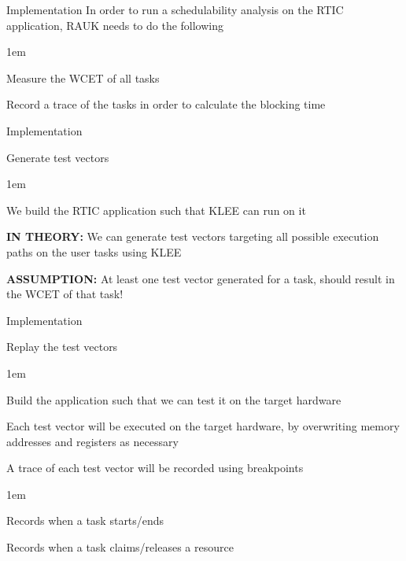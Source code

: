 \begin{frame}{Implementation}
    In order to run a schedulability analysis on the RTIC application,
    RAUK needs to do the following
    \begin{itemize-size}{1em}
        \item Measure the WCET of all tasks
        \item Record a trace of the tasks in order to
        calculate the blocking time
    \end{itemize-size}     
\end{frame}

\begin{frame}{Implementation}
    \begin{block}{Generate test vectors}
        \begin{itemize-size}{1em}
            \item We build the RTIC application such that KLEE can run on it
            \item \textbf{IN THEORY:} We can generate test vectors targeting all possible
            execution paths on the user tasks using KLEE
            \item \textbf{ASSUMPTION:} At least one test vector generated for a task, should
            result in the WCET of that task!
        \end{itemize-size}  
    \end{block}
\end{frame}

\begin{frame}{Implementation}
    \begin{block}{Replay the test vectors}
        \begin{itemize-size}{1em}
            \item Build the application such that we can test it on the target hardware
            \item Each test vector will be executed on the target hardware, by overwriting
            memory addresses and registers as necessary
            \item A trace of each test vector will be recorded using breakpoints
            \begin{itemize-size}{1em}
                \item Records when a task starts/ends
                \item Records when a task claims/releases a resource
            \end{itemize-size}
        \end{itemize-size}  
    \end{block}
\end{frame}

